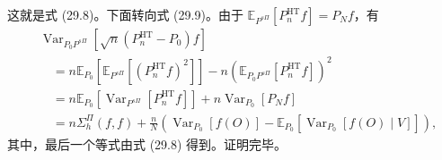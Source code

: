 这就是式 (29.8)。下面转向式 (29.9)。由于 $\mathbb E_{P^{s\Pi}}[P_n^{\mathrm{HT}}f]=P_Nf$，有
\[
\begin{aligned}
&\operatorname{Var}_{P_0P^{s\Pi}}\!\left[\sqrt n(P_n^{\mathrm{HT}}-P_0)f\right]\\
&\quad=n\mathbb E_{P_0}\!\left[\mathbb E_{P^{s\Pi}}\!\left[(P_n^{\mathrm{HT}}f)^2\right]\right]
-n\left(\mathbb E_{P_0P^{s\Pi}}\!\left[P_n^{\mathrm{HT}}f\right]\right)^2\\
&\quad=n\mathbb E_{P_0}\!\left[\operatorname{Var}_{P^{s\Pi}}\!\left[P_n^{\mathrm{HT}}f\right]\right]
+n\operatorname{Var}_{P_0}[P_Nf]\\
&\quad=n\Sigma_h^\Pi(f,f)
+\frac nN\left(\operatorname{Var}_{P_0}[f(O)]
-\mathbb E_{P_0}\!\left[\operatorname{Var}_{P_0}[f(O)\mid V]\right]\right),
\end{aligned}
\]
其中，最后一个等式由式 (29.8) 得到。证明完毕。
